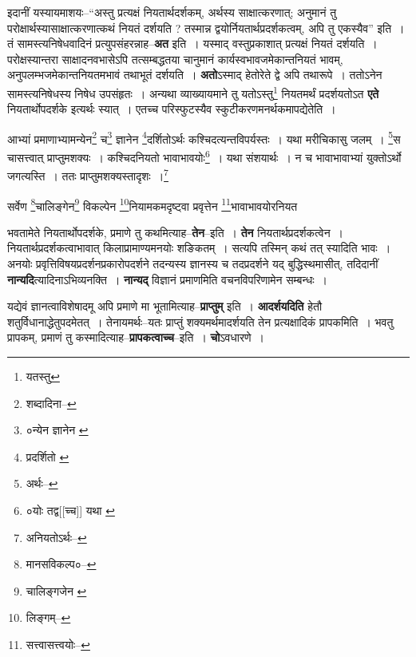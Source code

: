 \documentclass[article,12pt,a4paper]{memoir}
\begin{document}
	  \pstart इदानीं यस्यायमाशयः--“अस्तु प्रत्यक्षं नियतार्थदर्शकम्, अर्थस्य साक्षात्करणात्; अनुमानं तु परोक्षार्थस्यासाक्षात्करणात्कथं नियतं दर्शयति ? तस्मान्न द्वयोर्नियतार्थप्रदर्शकत्वम्, अपि तु एकस्यैव” इति । तं सामस्त्यनिषेधवादिनं प्रत्युपसंहरन्नाह--\textbf{अत} इति । यस्माद् वस्तुप्रकाशात् प्रत्यक्षं नियतं दर्शयति । परोक्षस्यान्तरा साक्षादनवभासेऽपि तत्सम्बद्धतया चानुमानं कार्यस्वभावजमेकान्तनियतं भावम्, अनुपलम्भजमेकान्तनियतमभावं तथाभूतं दर्शयति । \textbf{अतो}ऽस्माद् हेतोरेते द्वे अपि तथारूपे । ततोऽनेन सामस्त्यनिषेधस्य निषेध उपसंहृतः । अन्यथा व्याख्यायमाने तु यतोऽस्तु\footnote{यतस्तु} नियतमर्थं प्रदर्शयतोऽत \textbf{एते} नियतार्थोपदर्शके इत्यर्थः स्यात् । एतच्च परिस्फुटस्यैव स्कुटीकरणमनर्थकमापद्येतेति ।
	\pend
	  \bigskip
	  \begingroup
	

	  \pstart आभ्यां प्रमाणाभ्यामन्येन\footnote{शब्दादिना--\cite{dp-msD-n}} च\footnote{०न्येन ज्ञानेन \cite{dp-edE} \cite{dp-edN}} ज्ञानेन \footnote{प्रदर्शितो \cite{dp-msA} \cite{dp-msC} \cite{dp-edP} \cite{dp-edN}}\-दर्शितोऽर्थः कश्चिदत्यन्तविपर्यस्तः । यथा मरीचिकासु जलम् । \footnote{अर्थः--\cite{dp-msD-n}}\-स चासत्त्वात् प्राप्तुमशक्यः । कश्चिदनियतो भावाभावयोः\footnote{०योः तद्व[[च्च]] यथा \cite{dp-msC}} । यथा संशयार्थः । न च भावाभावाभ्यां युक्तोऽर्थो जगत्यस्ति । ततः प्राप्तुमशक्यस्तादृशः ।\footnote{अनियतोऽर्थः--\cite{dp-msD-n}}
	\pend
       

	  \pstart सर्वेण \footnote{मानसविकल्प०--\cite{dp-msD-n}}\-चालिङ्गेन\footnote{चालिङ्गजेन \cite{dp-msC} \cite{dp-msD} \cite{dp-msA} \cite{dp-msB} \cite{dp-edP} \cite{dp-edH} \cite{dp-edE} \cite{dp-edN}} विकल्पेन \footnote{लिङ्गम्--\cite{dp-msD-n}}\-नियामकमदृष्ट्वा प्रवृत्तेन \footnote{सत्त्वासत्त्वयोः--\cite{dp-msD-n}}\-भावाभावयोरनियत
	\pend
      
	  \endgroup
	

	  \pstart भवतामेते नियतार्थोपदर्शके, प्रमाणे तु कथमित्याह--\textbf{तेन}--इति । \textbf{तेन} नियतार्थप्रदर्शकत्वेन । नियतार्थप्रदर्शकत्वाभावात् किलाप्रामाण्यमनयोः शङिकतम् । सत्यपि तस्मिन् कथं तत् स्यादिति भावः । अनयोः प्रवृत्तिविषयप्रदर्शनप्रकारोपदर्शने तदन्यस्य ज्ञानस्य च तदप्रदर्शने यद् बुद्धिस्थमासीत्, तदिदानीं \textbf{नान्यदि}त्यादिनाऽभिव्यनक्ति । \textbf{नान्यद्} विज्ञानं प्रमाणमिति वचनविपरिणामेन सम्बन्धः ।
	\pend
      

	  \pstart यद्येवं ज्ञानत्वाविशेषादमू अपि प्रमाणे मा भूतामित्याह--\textbf{प्राप्तुम्} इति । \textbf{आदर्शयदिति} हेतौ शतुर्विधानाद्धेतुपदमेतत् । तेनायमर्थः--यतः प्राप्तुं शक्यमर्थमादर्शयति तेन प्रत्यक्षादिकं प्रापकमिति । भवतु प्रापकम्, प्रमाणं तु कस्मादित्याह--\textbf{प्रापकत्वाच्च}--इति । \textbf{चो}ऽवधारणे ।
	\pend
      
\end{document}

